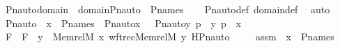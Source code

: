 \begin{isabellebody}
\ Pn{\isacharunderscore}{\kern0pt}auto{\isacharunderscore}{\kern0pt}domain\ {\isacharcolon}{\kern0pt}\ {\isachardoublequoteopen}domain{\isacharparenleft}{\kern0pt}Pn{\isacharunderscore}{\kern0pt}auto{\isacharparenleft}{\kern0pt}{\isasympi}{\isacharparenright}{\kern0pt}{\isacharparenright}{\kern0pt}\ {\isacharequal}{\kern0pt}\ P{\isacharunderscore}{\kern0pt}names{\isachardoublequoteclose}\isanewline
%
\isadelimproof
\ \ %
\endisadelimproof
%
\isatagproof
{}\isamarkupfalse%
\ Pn{\isacharunderscore}{\kern0pt}auto{\isacharunderscore}{\kern0pt}def\ domain{\isacharunderscore}{\kern0pt}def\ \isamarkupfalse%
\ auto%
\endisatagproof
{\isafoldproof}%
%
\isadelimproof
\ \isanewline
%
\endisadelimproof
\isanewline
{}\isamarkupfalse%
\ Pn{\isacharunderscore}{\kern0pt}auto\ {\isacharcolon}{\kern0pt}\ {\isachardoublequoteopen}x\ {\isasymin}\ P{\isacharunderscore}{\kern0pt}names\ {\isasymLongrightarrow}\ Pn{\isacharunderscore}{\kern0pt}auto{\isacharparenleft}{\kern0pt}{\isasympi}{\isacharparenright}{\kern0pt}{\isacharbackquote}{\kern0pt}x\ {\isacharequal}{\kern0pt}\ {\isacharbraceleft}{\kern0pt}\ {\isacharless}{\kern0pt}Pn{\isacharunderscore}{\kern0pt}auto{\isacharparenleft}{\kern0pt}{\isasympi}{\isacharparenright}{\kern0pt}{\isacharbackquote}{\kern0pt}y{\isacharcomma}{\kern0pt}\ {\isasympi}{\isacharbackquote}{\kern0pt}p{\isachargreater}{\kern0pt}\ {\isachardot}{\kern0pt}\ {\isacharless}{\kern0pt}y{\isacharcomma}{\kern0pt}\ p{\isachargreater}{\kern0pt}\ {\isasymin}\ x{\isacharbraceright}{\kern0pt}{\isachardoublequoteclose}\ \ \isanewline
%
\isadelimproof
%
\endisadelimproof
%
\isatagproof
{}\isamarkupfalse%
\ {\isacharminus}{\kern0pt}\isanewline
\ \ \isamarkupfalse%
\ F\ \ {\isachardoublequoteopen}F\ {\isasymequiv}\ {\isasymlambda}y\ {\isasymin}\ Memrel{\isacharparenleft}{\kern0pt}M{\isacharparenright}{\kern0pt}{\isacharcircum}{\kern0pt}{\isacharplus}{\kern0pt}\ {\isacharminus}{\kern0pt}{\isacharbackquote}{\kern0pt}{\isacharbackquote}{\kern0pt}{\isacharbraceleft}{\kern0pt}x{\isacharbraceright}{\kern0pt}{\isachardot}{\kern0pt}\ wftrec{\isacharparenleft}{\kern0pt}Memrel{\isacharparenleft}{\kern0pt}M{\isacharparenright}{\kern0pt}{\isacharcircum}{\kern0pt}{\isacharplus}{\kern0pt}{\isacharcomma}{\kern0pt}\ y{\isacharcomma}{\kern0pt}\ HPn{\isacharunderscore}{\kern0pt}auto{\isacharparenleft}{\kern0pt}{\isasympi}{\isacharparenright}{\kern0pt}{\isacharparenright}{\kern0pt}{\isachardoublequoteclose}\ \isanewline
\isanewline
\ \ \isamarkupfalse%
\ assm\ {\isacharcolon}{\kern0pt}\ {\isachardoublequoteopen}x\ {\isasymin}\ P{\isacharunderscore}{\kern0pt}names{\isachardoublequoteclose}\isanewline

\end{isabellebody}

